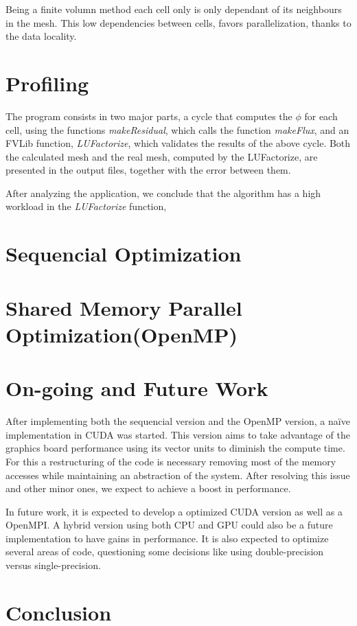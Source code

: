 \documentclass[a4paper,10pt,openright,openbib,twocolumn]{article}
\begin{document}
Being a finite volumn method each cell only is only dependant of its neighbours in the mesh. This low dependencies between cells, favors parallelization, thanks to the data locality.

\section{Profiling}

The program consists in two major parts, a cycle that computes the $\phi$ for each cell, using the functions \emph{makeResidual}, which calls the function \emph{makeFlux}, and an FVLib function, \emph{LUFactorize}, which validates the results of the above cycle. Both the calculated mesh and the real mesh, computed by the LUFactorize, are presented in the output files, together with the error between them.
 
After analyzing the application, we conclude that the algorithm has a high workload in the \emph{LUFactorize} function,


\section{Sequencial Optimization}


\section{Shared Memory Parallel Optimization(OpenMP)}


\section{On-going and Future Work}

After implementing both the sequencial version and the OpenMP version, a na\"{i}ve implementation in CUDA was started. This version aims to take advantage of the graphics board performance using its vector units to diminish the compute time. For this a restructuring of the code is necessary removing most of the memory accesses while maintaining an abstraction of the system. After resolving this issue and other minor ones, we expect to achieve a boost in performance.

In future work, it is expected to develop a optimized CUDA version as well as a OpenMPI. A hybrid version using both CPU and GPU could also be a future implementation to have gains in performance. It is also expected to optimize several areas of code, questioning some decisions like using double-precision versus single-precision. 

\section{Conclusion}

\end{document}
